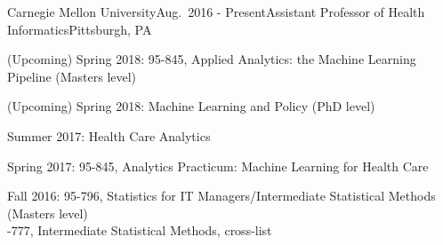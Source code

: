 \begin{rSubsection}{Carnegie Mellon University}{Aug.\ 2016 - Present}{Assistant Professor of Health Informatics}{Pittsburgh, PA}
\item (Upcoming) Spring 2018: 95-845, Applied Analytics: the Machine Learning Pipeline (Masters level)
\item (Upcoming) Spring 2018: Machine Learning and Policy (PhD level)
\item Summer 2017: Health Care Analytics
\item Spring 2017: 95-845, Analytics Practicum: Machine Learning for Health Care
\item Fall 2016: 95-796, Statistics for IT Managers/Intermediate Statistical Methods (Masters level)
  \\ -777, Intermediate Statistical Methods, cross-list
\end{rSubsection}







